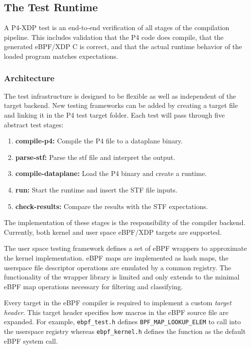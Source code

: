 \subsection{The Test Runtime}
A P4-XDP test is an end-to-end verification of all stages of 
the compilation pipeline. This includes validation that the P4 code does 
compile, that the generated eBPF/XDP C is correct, and that the actual runtime 
behavior of the loaded program matches expectations.

\subsubsection{Architecture}
The test infrastructure is designed to be flexible as well as independent of 
the target backend. New testing frameworks can be added by creating a target 
file and linking it in the P4 test target folder. Each test will pass through 
five abstract test stages:\\
\begin{enumerate}
\item\textbf{compile-p4:} Compile the P4 file to a dataplane binary.
\item \textbf{parse-stf:} Parse the stf file and interpret the output.
\item \textbf{compile-dataplane:} Load the P4 binary and create a runtime.
\item \textbf{run:} Start the runtime and insert the STF file inputs.
\item \textbf{check-results:} Compare the results with the STF 
expectations.
\end{enumerate}

The implementation of these stages is the responsibility of the compiler 
backend.
Currently, both kernel and user space eBPF/XDP targets are supported.

The user space testing framework defines a set of eBPF wrappers to approximate 
the kernel implementation. eBPF maps are implemented as hash maps, the 
userspace file descriptor operations are emulated by a common registry. 
The functionality of the wrapper library is limited and only extends to the 
minimal eBPF map operations necessary for filtering and classifying.

Every target in the eBPF compiler is required to implement a custom 
\textit{target header}. This target header specifies how macros in the eBPF 
source file are expanded. For example, \texttt{ebpf\_test.h} defines 
\texttt{BPF\_MAP\_LOOKUP\_ELEM} to call into the userspace registry whereas 
\texttt{ebpf\_kernel.h} defines the function as the default eBPF system call.

